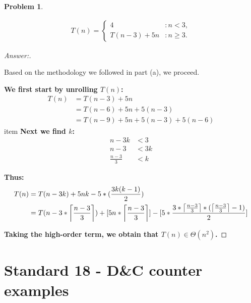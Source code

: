 \documentclass[11pt]{article}
\theoremstyle{definition}
\theoremstyle{definition}
\newtheorem{required}{Problem}
\theoremstyle{definition}
\begin{document}
\begin{required}
\begin{enumerate} [label=(\alph*)]
\newpage
\item
\begin{align*}
T(n) = \begin{cases}
4 & : n < 3, \\
T(n-3) + 5n & : n \geq 3.
\end{cases}
\end{align*}

\begin{proof}[Answer:] \
\item Based on the methodology we followed in part (a), we proceed. \\
\DeclarePairedDelimiter{\ceil}{\lceil}{\rceil}
\item \textbf{We first start by unrolling $T(n)$:}
\begin{align*}
T(n) &= T(n - 3) + 5n \\
&= T(n - 6) + 5n + 5(n - 3) \\
&= T(n - 9) + 5n +5(n - 3) + 5(n-6)
\end{align*}
item \textbf{Next we find $k$:}
\begin{align*}
n - 3k &< 3 \\
n - 3 &< 3k \\
\frac{n - 3}{3} &< k
\end{align*}
\item \textbf{Thus:} 
\begin{align*}
T(n) &= T(n - 3k) + 5nk - 5 * (\frac{3k(k - 1)}{2}) \\
&= T(n - 3 * \ceil*{\frac{n - 3}{3}}) + [5n * \ceil*{\frac{n - 3}{3}}] - [5 * \frac{3 * \ceil*{\frac{n - 3}{3}} * (\ceil*{\frac{n - 3}{3}} - 1)}{2}]
\end{align*}
\item \textbf{Taking the high-order term, we obtain that $T(n) \in \Theta(n^{2})$.}

\end{proof}
\end{enumerate}

\end{required}
\newpage
\section{Standard 18 - D\&C counter examples}
\end{document}
